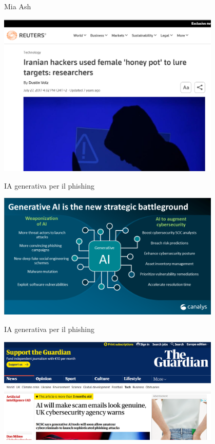 \documentclass[11pt]{beamer}
\begin{document}
\begin{frame}{Mia Ash \cite{mia_ash_reuters}}

\begin{center}
\includegraphics[width=0.8\textwidth]{Pic/reuters_miaash.png}
\end{center}

\end{frame}


\begin{frame}{IA generativa per il phishing \cite{genia_minacce}}

\begin{center}
\includegraphics[width=0.8\textwidth]{Pic/GEN_IA_minacce.png}
\end{center}

\end{frame}

\begin{frame}{IA generativa per il phishing \cite{genia_gur}}

\begin{center}
\includegraphics[width=0.8\textwidth]{Pic/AI_phishing.png}
\end{center}

\end{frame}
\end{document}
